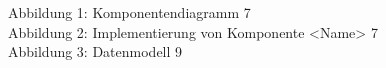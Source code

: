 







\tableofcontents                          %
\listoffigures                            %

Abbildung 1: Komponentendiagramm                                         7\\
Abbildung 2: Implementierung von Komponente <Name>                       7\\
Abbildung 3: Datenmodell                                                 9\\

  


